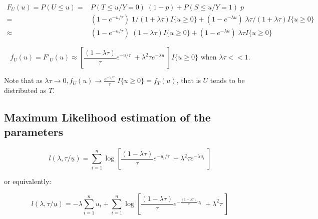 \documentclass[11pt,A4paper]{article}
\begin{document}
\begin{align*}
F_U(u) 	= P(U \leq u) 	= & P(T \leq u /Y\!=\!0) \; (1-p) + P(S \leq u /Y\!=\!1) \; p \\
						= & (1 - e^{-u/\tau}) \; 1/(1 + \lambda \tau) I\{u \geq 0\} + 
							(1 - e^{-\lambda u}) \; \lambda \tau /(1 + \lambda \tau) I\{u \geq 0\} \\
						\approx & (1 - e^{-u/\tau}) \; (1 - \lambda \tau) I\{u \geq 0\} +
							 (1 - e^{-\lambda u}) \; \lambda \tau I\{u \geq 0\}
\end{align*}

\[
f_U(u) = F'_U(u) \approx \left[ \frac{(1 - \lambda \tau)}{\tau} e^{-u/\tau} \; + \lambda^2 \tau e^{-\lambda u} \; \right] I\{u \geq 0\}
\textrm{ when } \lambda \tau << 1.
\]

Note that as $\lambda \tau \to 0, f_U(u) \to \frac{e^{-u/\tau}}{\tau} \; I\{u \geq 0\} = f_T(u)$, that is $U$ tends to be distributed as $T$.

\subsection{Maximum Likelihood estimation of the parameters}
\[
l(\lambda, \tau / \underline{u}) = \sum_{i=1}^{n} \log \left[ \frac{(1 - \lambda \tau)}{\tau} e^{-u_i/\tau} \; + \lambda^2 \tau e^{-\lambda u_i} \; \right]
\]

or equivalently:

\[
l(\lambda, \tau / \underline{u}) = -\lambda \sum_{i=1}^{n} u_i + 
											\sum_{i=1}^{n} {\log \left[ \frac{(1 - \lambda \tau)}{\tau} e^{-\frac{(1 - \lambda \tau)}{\tau} u_i} \; + \lambda^2 \tau \; \right]}
\]

\fi
\end{document}
